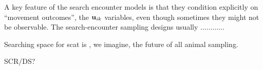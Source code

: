 A key feature of the search encounter models is that they condition
explicitly on ``movement outcomes'', the ${\bf u}_{ik}$ variables,
even though sometimes they might not be observable.
The search-encounter sampling designs usually ............

Searching space for scat is , we imagine, the future of all animal
sampling.


SCR/DS?